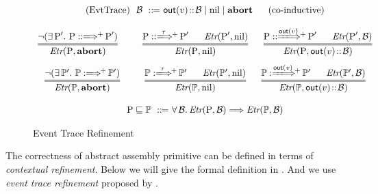 \begin{figure*}[!t]
    \centering
    \[
        \begin{array}{c}
            \TYPE{(EvtTrace)} \ \ \evttr \ \define \ 
            \outEvt{\val} \stCons \evttr \sepline \nil \sepline 
            \evtabort \quad \ \ \TYPE{(co-inductive)} \\
            \\
            \infer=
            {
                \Etr{(\prog, \evtabort)}
            }
            {
                \neg
                (\exists \, \prog'. \ 
                 \LGlobMultiTrans{\prog}{}{+}{\prog'})
            } \qquad \ \ 
            \infer= 
            {
                \Etr{(\prog, \nil)}
            }
            {
                \LGlobMultiTrans{\prog}{ \, \empmsg \ }{+}{\prog'} 
                \quad \ \ 
                \Etr{(\prog', \nil)}
            } \quad \ \ 
            \infer=
            {
                \Etr{(\prog, \outEvt{\val} \stCons \evttr)}
            }
            {
                \LGlobMultiTrans{\prog}{\!\!\outEvt{\val}\!}{+}{\prog'}
                \quad \ \ 
                \Etr{(\prog', \evttr)}
            } \\
            \\[-5pt]
            \infer=
            {
                \Etr{(\HProg, \evtabort)}
            }
            {
                \neg
                (\exists \, \HProg'. \ 
                 \HGlobMultiTrans{\HProg}{}{+}{\HProg'})
            } \qquad \ \ 
            \infer= 
            {
                \Etr{(\HProg, \nil)}
            }
            {
                \HGlobMultiTrans{\HProg}{ \, \empmsg \ }{+}{\HProg'} 
                \quad \ \ 
                \Etr{(\HProg', \nil)}
            } \quad \ \ 
            \infer=
            {
                \Etr{(\HProg, \outEvt{\val} \stCons \evttr)}
            }
            {
                \HGlobMultiTrans{\HProg}{\!\!\outEvt{\val}\!}{+}{\HProg'}
                \quad \ \ 
                \Etr{(\HProg', \evttr)}
            } \\
            \\
            \prog \refine \HProg \ \define \ 
                \forall \, \evttr. \, 
                \Etr{(\prog, \evttr)} \Longrightarrow
                \Etr{(\HProg, \evttr)}  
        \end{array}
    \]
    \caption{Event Trace Refinement}
    \label{fig:event-trace-refinement}
\end{figure*}

The correctness of abstract assembly primitive can be defined in terms of  
{\it contextual refinement}.  
Below we will give the formal definition in 
\Def{\ref{def:prim-correctness}}.  
And we use {\it event trace refinement} 
proposed by \etal{Liang} \cite{liang14lics}.

